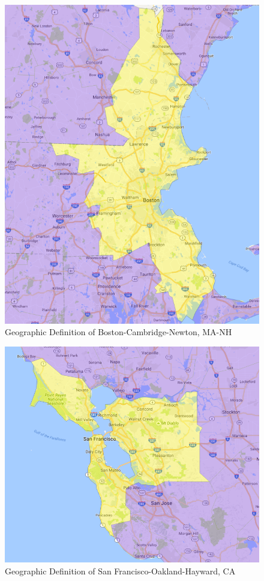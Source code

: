 \documentclass[12pt]{article}
\begin{document}
\begin{figure}[h]
\begin{centering}
  \includegraphics[width=\textwidth]{Boston}
  \caption{Geographic Definition of Boston-Cambridge-Newton, MA-NH}
   \label{fig:Boston}
\end{centering}
\end{figure}

\begin{figure}[h]
\begin{centering}
  \includegraphics[width=\textwidth]{SanFrancisco}
  \caption{Geographic Definition of San Francisco-Oakland-Hayward, CA}
   \label{fig:SanFrancisco}
\end{centering}
\end{figure}
\end{document}
